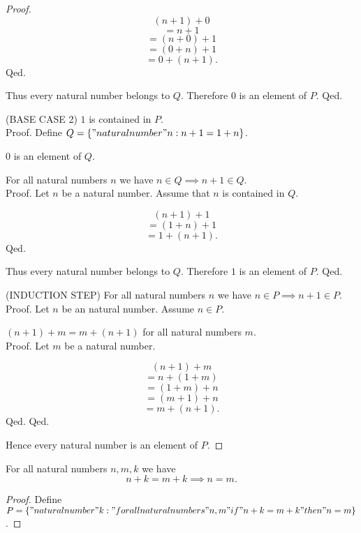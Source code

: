 \documentclass[../../natural-numbers.ftl.tex]{subfiles}
\begin{document}
\begin{forthel}
\begin{proof}
          $$  (n + 1) + 0$$
          $$= n + 1$$        %
          $$= (n + 0) + 1$$  %
          $$= (0 + n) + 1$$  %
          $$= 0 + (n + 1).$$ %
        Qed.

        Thus every natural number belongs to $Q$.
        Therefore $0$ is an element of $P$.
      Qed.

      (BASE CASE 2) $1$ is contained in $P$. \\
      Proof.
        Define $Q = \{ "natural number" n : n + 1 = 1 + n \}$.

        $0$ is an element of $Q$.

        For all natural numbers $n$ we have $n \in Q \implies n + 1 \in Q$. \\
        Proof.
          Let $n$ be a natural number.
          Assume that $n$ is contained in $Q$.

          $$  (n + 1) + 1$$
          $$= (1 + n) + 1$$  %
          $$= 1 + (n + 1).$$ %
        Qed.

        Thus every natural number belongs to $Q$.
        Therefore $1$ is an element of $P$.
      Qed.

      (INDUCTION STEP) For all natural numbers $n$ we have $n \in P \implies n + 1 \in P$. \\
      Proof.
        Let $n$ be an natural number.
        Assume $n \in P$.

        $(n + 1) + m = m + (n + 1)$ for all natural numbers $m$. \\
        Proof.
          Let $m$ be a natural number.

          $$  (n + 1) + m$$
          $$= n + (1 + m)$$  %
          $$= (1 + m) + n$$  %
          $$= (m + 1) + n$$  %
          $$= m + (n + 1).$$ %
        Qed.
      Qed.

      Hence every natural number is an element of $P$.
    \end{proof}


    \begin{proposition}[NN 01 02 882987]
      For all natural numbers $n,m,k$ we have
      $$n + k = m + k \implies n = m.$$
    \end{proposition}
    \begin{proof}
      Define $P = \{ "natural number" k : "for all natural numbers" n,m "if" n + k = m + k "then" n = m \}$.


\end{proof}
\end{forthel}
\end{document}
